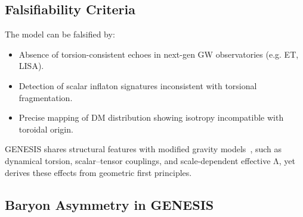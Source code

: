 \documentclass{article}
\begin{document}
\medskip
\begin{center}
\end{center}
\medskip


\subsection{Falsifiability Criteria} The model can be falsified by: \begin{itemize} \item Absence of torsion-consistent echoes in next-gen GW observatories (e.g. ET, LISA). \item Detection of scalar inflaton signatures inconsistent with torsional fragmentation. \item Precise mapping of DM distribution showing isotropy incompatible with toroidal origin. \end{itemize}

\medskip
\begin{center}
\end{center}
\medskip

GENESIS shares structural features with modified gravity models~\cite{nojiri2017,saridakis2021}, such as dynamical torsion, scalar–tensor couplings, and scale-dependent effective Λ, yet derives these effects from geometric first principles.


\subsection{Baryon Asymmetry in GENESIS}
\label{subsec:baryon_asymmetry}
\end{document}
